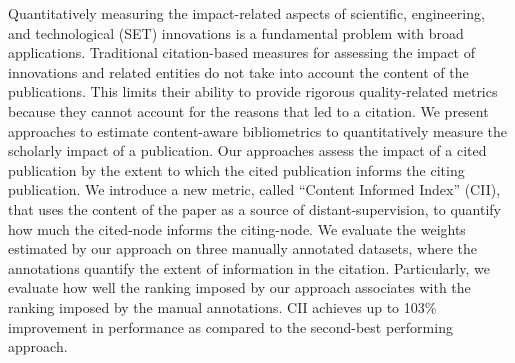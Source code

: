 Quantitatively measuring the impact-related aspects of scientific, engineering, and technological (SET) innovations is a fundamental problem with broad applications. Traditional citation-based measures for assessing the impact of innovations and related entities do not take into account the content of the publications. This limits their ability to provide rigorous quality-related metrics because they cannot account for the reasons that led to a citation. We present approaches to estimate content-aware bibliometrics to quantitatively measure the scholarly impact of a publication. Our approaches assess the impact of a cited publication by the extent to which the cited publication informs the citing publication. We introduce a new metric, called ``Content Informed Index'' (CII), that uses the content of the paper as a source of distant-supervision, to quantify how much the cited-node informs the citing-node. We evaluate the weights estimated by our approach on three manually annotated datasets, where the annotations quantify the extent of information in the citation. Particularly, we evaluate how well the ranking imposed by our approach associates with the ranking imposed by the manual annotations. CII achieves up to  103\% improvement in performance as compared to the second-best performing approach.
